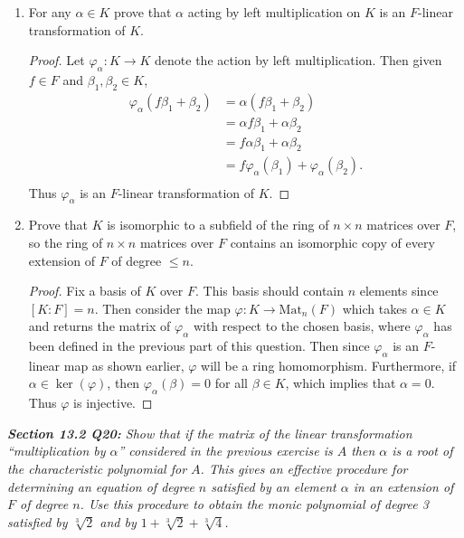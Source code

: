 \documentclass{article}
\begin{document}
  \begin{enumerate}[label={(\alph*)}]
    \item For any $\alpha\in K$ prove that $\alpha$ acting by left
      multiplication on $K$ is an $F$-linear transformation of $K$.

      \begin{proof}
        Let $\varphi_\alpha:K\rightarrow K$ denote the action by left
        multiplication. Then given $f\in F$ and $\beta_1,\beta_2\in K$,
        \begin{align*}
          \varphi_\alpha(f\beta_1+\beta_2) &=\alpha(f\beta_1+\beta_2)\\
          &=\alpha f\beta_1 +\alpha \beta_2\\
          &=f \alpha \beta_1 +\alpha \beta_2\\
          &=f \varphi_\alpha(\beta_1) +\varphi_\alpha(\beta_2).\\
        \end{align*}
        Thus $\varphi_\alpha$ is an $F$-linear transformation of $K$.
      \end{proof}

    \item Prove that $K$ is isomorphic to a subfield of the ring of
      $n\times n$ matrices over $F$, so the ring of $n\times n$ matrices
      over $F$ contains an isomorphic copy of every extension of $F$ of
      degree $\leq n$.

      \begin{proof}
        Fix a basis of $K$ over $F$. This basis should contain $n$ elements
        since $[K:F]=n$. Then consider the map $\varphi:
        K\rightarrow\text{Mat}_n(F)$ which takes $\alpha\in K$ and returns
        the matrix of $\varphi_\alpha$ with respect to the chosen basis,
        where $\varphi_\alpha$ has been defined in the previous part of
        this question. Then since $\varphi_\alpha$ is an $F$-linear map as
        shown earlier, $\varphi$ will be a ring homomorphism. Furthermore,
        if $\alpha\in\ker(\varphi)$, then $\varphi_\alpha(\beta)=0$ for all
        $\beta\in K$, which implies that $\alpha=0$. Thus $\varphi$ is
        injective.
      \end{proof}
  \end{enumerate}

\it \textbf{Section 13.2 Q20:} Show that if the matrix of the linear
  transformation ``multiplication by $\alpha$'' considered in the previous
  exercise is $A$ then $\alpha$ is a root of the characteristic polynomial
  for $A$. This gives an effective procedure for determining an equation of
  degree $n$ satisfied by an element $\alpha$ in an extension of $F$ of
  degree $n$. Use this procedure to obtain the monic polynomial of degree 3
  satisfied by $\sqrt[3]{2}$ and by $1+\sqrt[3]{2}+\sqrt[3]{4}$.
\end{document}
